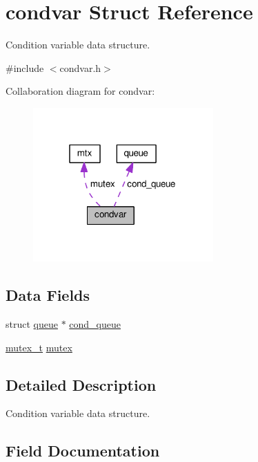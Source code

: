 \hypertarget{structcondvar}{}\section{condvar Struct Reference}
\label{structcondvar}


Condition variable data structure.  




{\ttfamily \#include $<$condvar.\+h$>$}



Collaboration diagram for condvar\+:\nopagebreak
\begin{figure}[H]
\begin{center}
\leavevmode
\includegraphics[width=196pt]{structcondvar__coll__graph}
\end{center}
\end{figure}
\subsection*{Data Fields}
\begin{DoxyCompactItemize}
\item 
struct \hyperlink{structqueue}{queue} $\ast$ \hyperlink{structcondvar_abf91dd97763d95af19ee92a17f55afb8}{cond\+\_\+queue}
\item 
\hyperlink{mutex_8h_af6ff4e9d708d58c0662f63a81713a926}{mutex\+\_\+t} \hyperlink{structcondvar_a573f1b5d528d692d581b734913807b66}{mutex}
\end{DoxyCompactItemize}


\subsection{Detailed Description}
Condition variable data structure. 

\subsection{Field Documentation}
\mbox{\label{structcondvar_abf91dd97763d95af19ee92a17f55afb8}} 
